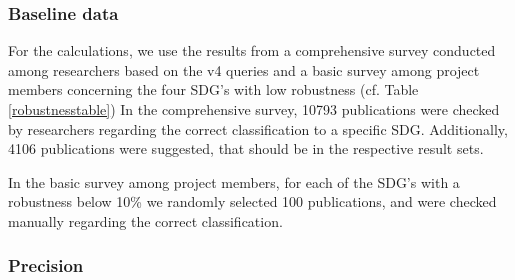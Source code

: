 \documentclass{article}
\begin{document}
\subsubsection{Baseline data}
 
For the calculations, we use the results from a comprehensive survey conducted among researchers based on the v4 queries \cite{vanderfeesten_survey_2020} and a basic survey among project members concerning the four SDG's with low robustness (cf. Table \ref{robustnesstable})
In the comprehensive survey, 10793 publications were checked by researchers regarding the correct classification to a specific SDG. Additionally, 4106 publications were suggested, that should be in the respective result sets.

In the basic survey among project members, for each of the SDG's with a robustness below 10\% we randomly selected 100 publications, and were checked manually regarding the correct classification.

\subsubsection{Precision}
\end{document}
